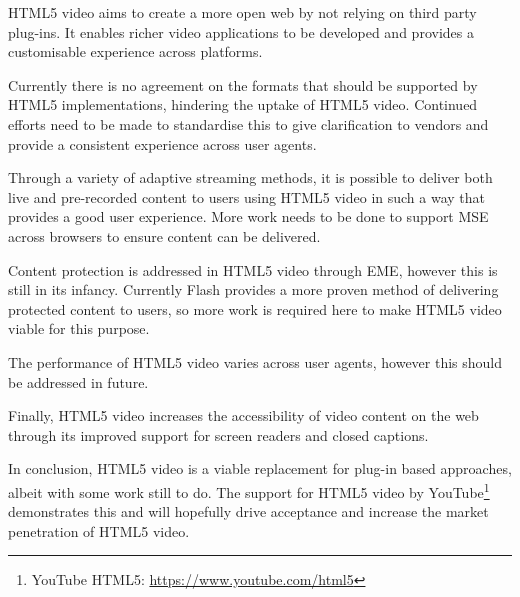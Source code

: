 \documentclass[journal]{IEEEtran}
\begin{document}
HTML5 video aims to create a more open web by not relying on third party plug-ins. It enables richer video applications to be developed and provides a customisable experience across platforms.

Currently there is no agreement on the formats that should be supported by HTML5 implementations, hindering the uptake of HTML5 video. Continued efforts need to be made to standardise this to give clarification to vendors and  provide a consistent experience across user agents.

Through a variety of adaptive streaming methods, it is possible to deliver both live and pre-recorded content to users using HTML5 video in such a way that provides a good user experience. More work needs to be done to support MSE across browsers to ensure content can be delivered.

Content protection is addressed in HTML5 video through EME, however this is still in its infancy. Currently Flash provides a more proven method of delivering protected content to users, so more work is required here to make HTML5 video viable for this purpose.

The performance of HTML5 video varies across user agents, however this should be addressed in future.

Finally, HTML5 video increases the accessibility of video content on the web through its improved support for screen readers and closed captions.

In conclusion, HTML5 video is a viable replacement for plug-in based approaches, albeit with some work still to do. The support for HTML5 video by YouTube\footnote{YouTube HTML5: \url{https://www.youtube.com/html5}} demonstrates this and will hopefully drive acceptance and increase the market penetration of HTML5 video.

%
%
\end{document}
